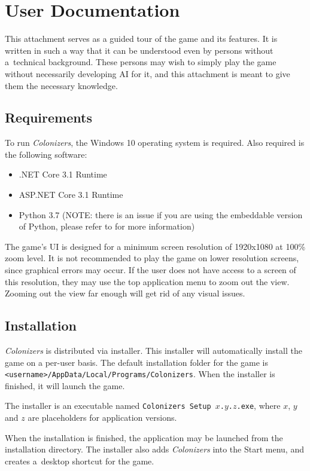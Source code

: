 \section{User Documentation}
\label{sec:userdocs}

This attachment serves as a guided tour of the game and its features.
It is written in such a way that it can be understood even by persons
without a~technical background. These persons may wish to simply
play the game without necessarily developing AI for it, and this attachment
is meant to give them the necessary knowledge.

\subsection{Requirements}

To run \emph{Colonizers}, the Windows 10 operating system is required.
Also required is the following software:
\begin{itemize}
    \item .NET Core 3.1 Runtime
    \item ASP.NET Core 3.1 Runtime
    \item Python 3.7 (NOTE: there is an issue if you are using the embeddable
        version of Python, please refer to  for more information)
\end{itemize}
The game's UI is designed for a minimum screen resolution of 1920x1080 at
100\% zoom level. It is not recommended to play the game on lower resolution
screens, since graphical errors may occur. If the user does not have access
to a screen of this resolution, they may use the top application
menu to zoom out the view. Zooming out the view far enough will get rid
of any visual issues.

\subsection{Installation}

\emph{Colonizers} is distributed via installer. This installer
will automatically install the game on a per-user basis.
The default installation folder for the game is
\texttt{<username>/AppData/Local/Programs/Colonizers}.
When the installer is finished, it will launch the game.

The installer is an executable named \texttt{Colonizers Setup $x$.$y$.$z$.exe},
where $x$, $y$ and $z$ are placeholders for application versions. 

When the installation is finished, the application may be launched from the installation
directory. The installer also adds \emph{Colonizers} into the Start menu, and creates
a~desktop shortcut for the game.

